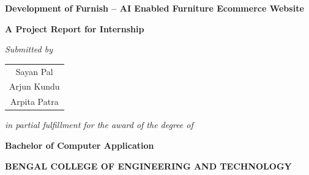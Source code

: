\documentclass[12pt,a4paper]{article}
\begin{document}

\begin{center}


{\color{bcetblue}
\fontsize{16}{21}\selectfont
\textbf{Development of Furnish -- AI Enabled Furniture Ecommerce Website}
}

\vfill


{\fontsize{16}{20}\selectfont
\bfseries
A Project Report for Internship
}

\vfill


{\fontsize{18}{27}\selectfont
\itshape
Submitted by
}

\nopagebreak\vspace{0.12in}

{\fontsize{18}{27}\selectfont
\bfseries
\begin{tabular}{c}
Sayan Pal \\[5pt]
Arjun Kundu \\[5pt]
Arpita Patra
\end{tabular}
}

\vfill


{\fontsize{18}{27}\selectfont
\itshape
in partial fulfillment for the award of the degree of
}

\nopagebreak\vspace{0.12in}

{\color{bcetblue}
\fontsize{15}{19}\selectfont
\bfseries
Bachelor of Computer Application
}

\vfill


{\color{bcetblue}
\fontsize{16}{20}\selectfont
\bfseries
BENGAL COLLEGE OF ENGINEERING AND TECHNOLOGY
}


\end{center}
\end{document}
